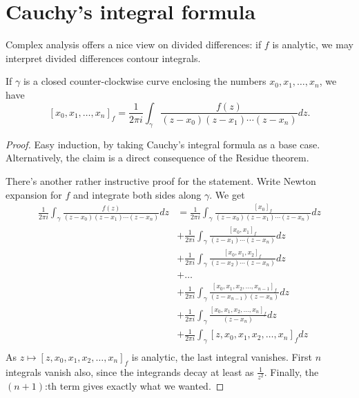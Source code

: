 \section{Cauchy's integral formula}

Complex analysis offers a nice view on divided differences: if $f$ is analytic, we may interpret divided differences contour integrals.

\begin{lem}\label{div_cauchy}
If $\gamma$ is a closed counter-clockwise curve enclosing the numbers $x_{0}, x_{1}, \ldots, x_{n}$, we have
\[
	[x_{0}, x_{1}, \ldots, x_{n}]_{f} = \frac{1}{2 \pi i} \int_{\gamma} \frac{f(z)}{(z - x_{0})(z - x_{1}) \cdots (z - x_{n})} dz.
\]
\end{lem}
\begin{proof}
Easy induction, by taking Cauchy's integral formula as a base case. Alternatively, the claim is a direct consequence of the Residue theorem.

There's another rather instructive proof for the statement. Write Newton expansion for $f$ and integrate both sides along $\gamma$. We get
\begin{align*}
	\frac{1}{2 \pi i} \int_{\gamma} \frac{f(z)}{(z - x_{0})(z - x_{1}) \cdots (z - x_{n})} dz &= \frac{1}{2 \pi i} \int_{\gamma} \frac{[x_{0}]_{f}}{(z - x_{0})(z - x_{1}) \cdots (z - x_{n})} dz \\
	&+ \frac{1}{2 \pi i} \int_{\gamma} \frac{[x_{0}, x_{1}]_{f}}{(z - x_{1}) \cdots (z - x_{n})} dz \\
	&+ \frac{1}{2 \pi i} \int_{\gamma} \frac{[x_{0}, x_{1}, x_{2}]_{f}}{(z - x_{2}) \cdots (z - x_{n})} dz \\
	&+ \ldots \\
	&+ \frac{1}{2 \pi i} \int_{\gamma} \frac{[x_{0}, x_{1}, x_{2}, \ldots, x_{n - 1}]_{f}}{(z - x_{n - 1})(z - x_{n})} dz \\
	&+ \frac{1}{2 \pi i} \int_{\gamma} \frac{[x_{0}, x_{1}, x_{2}, \ldots, x_{n}]_{f}}{(z - x_{n})} dz \\
	&+ \frac{1}{2 \pi i} \int_{\gamma} [z, x_{0}, x_{1}, x_{2}, \ldots, x_{n}]_{f} dz \\
\end{align*}
As $z \mapsto [z, x_{0}, x_{1}, x_{2}, \ldots, x_{n}]_{f}$ is analytic, the last integral vanishes. First $n$ integrals vanish also, since the integrands decay at least as $\frac{1}{z^2}$. Finally, the $(n + 1)$:th term gives exactly what we wanted.
\end{proof}

